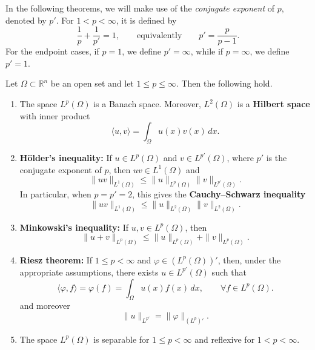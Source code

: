 \begin{remark}
    \label{rem:conjugate-exponent}

    In the following theorems, we will make use of the \textit{conjugate
    exponent} of $p$, denoted by $p'$. For $1<p<\infty$, it is defined by
    \[
        \frac{1}{p}+\frac{1}{p'}=1,
        \qquad\text{equivalently}\qquad
        p'=\frac{p}{p-1}.
    \]
    For the endpoint cases, if $p=1$, we define $p'=\infty$, while if $p=\infty$, we define $p'=1$.
\end{remark}

\begin{theorem}
    \label{thm:Lebesgue-results}

    Let $\Omega\subset\mathbb{R}^n$ be an open set and let
    $1\leq p\leq\infty$. Then the following hold.

    \begin{enumerate}
        \item[(i)] The space $L^p(\Omega)$ is a Banach space. Moreover,
        $L^2(\Omega)$ is a \textbf{Hilbert space} with inner product
        \[
            \langle u,v\rangle
            =
            \int_{\Omega}u(x)v(x)\,dx.
        \]

        \item[(ii)] \textbf{Hölder's inequality:}
        If $u\in L^p(\Omega)$ and $v\in L^{p'}(\Omega)$, where $p'$ is
        the conjugate exponent of $p$, then $uv\in L^1(\Omega)$ and
        \[
            \|uv\|_{L^1(\Omega)}
            \leq
            \|u\|_{L^p(\Omega)}
            \|v\|_{L^{p'}(\Omega)}.
        \]
        In particular, when $p=p'=2$, this gives the
        \textbf{Cauchy--Schwarz inequality}
        \[
            \|uv\|_{L^1(\Omega)}
            \leq
            \|u\|_{L^2(\Omega)}
            \|v\|_{L^2(\Omega)}.
        \]

        \item[(iii)] \textbf{Minkowski's inequality:}
        If $u,v\in L^p(\Omega)$, then
        \[
            \|u+v\|_{L^p(\Omega)}
            \leq
            \|u\|_{L^p(\Omega)}
            +
            \|v\|_{L^p(\Omega)}.
        \]

        \item[(iv)] \textbf{Riesz theorem:}
        If $1\leq p<\infty$ and $\varphi\in(L^p(\Omega))'$, then,
        under the appropriate assumptions, there exists
        $u\in L^{p'}(\Omega)$ such that
        \[
            \langle\varphi,f\rangle
            =
            \varphi(f)
            =
            \int_{\Omega}u(x)f(x)\,dx,
            \qquad
            \forall f\in L^p(\Omega).
        \]
        and moreover 
        \[
            \|u\|_{L^{p'}} = \|\varphi\|_{{(L^p)}'}.
        \]
        \item[(v)] The space $L^p(\Omega)$ is separable for
        $1\leq p<\infty$ and reflexive for $1<p<\infty$.


\end{enumerate}
\end{theorem}
